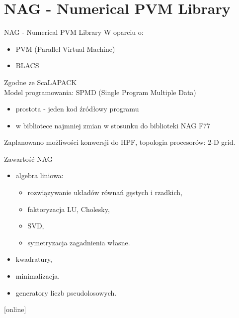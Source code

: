 \section{NAG - Numerical PVM Library}
	\begin{frame}{NAG - Numerical PVM Library}
	W oparciu o: 
		\begin{itemize}
			\item PVM (Parallel Virtual Machine)
			\item BLACS
		\end{itemize}
		Zgodne ze ScaLAPACK \\
		Model programowania: SPMD (Single Program Multiple Data)
		\begin{itemize}
			\item prostota - jeden kod źródłowy programu	
			\item w bibliotece najmniej zmian w stosunku do biblioteki NAG F77
		\end{itemize}
		Zaplanowano możliwości konwersji do HPF, topologia procesorów: 2-D grid. 
	\end{frame}
	\begin{frame}{Zawartość NAG}
		\begin{itemize}
			\item algebra liniowa:
				\begin{itemize}
					\item rozwiązywanie układów równań gęstych i rzadkich,
					\item faktoryzacja LU, Cholesky,
					\item SVD,
					\item symetryzacja zagadnienia własne. %
				\end{itemize}
			\item kwadratury,
			\item minimalizacja.
			\item generatory liczb pseudolosowych.
		\end{itemize}
		\begin{thebibliography}{9}
		\end{thebibliography}
	\end{frame}